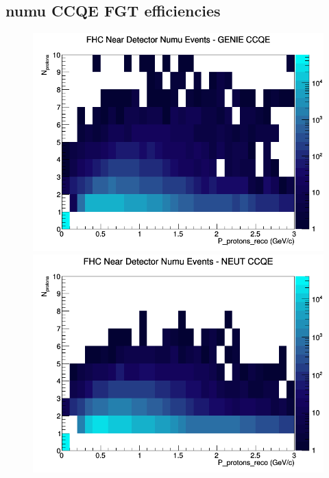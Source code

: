 \documentclass[12pt]{article}
\begin{document}
\subsection{numu CCQE FGT efficiencies}
\begin{figure}[h]
\includegraphics[width=\linewidth]{eff_N_P/FGT/protons/CCQE_FHC_ND_numu_N_P_GENIE.png}
\endminipage
{}
\includegraphics[width=\linewidth]{eff_N_P/FGT/protons/CCQE_FHC_ND_numu_N_P_NEUT.png}
\endminipage
{}

\end{figure}
\end{document}
